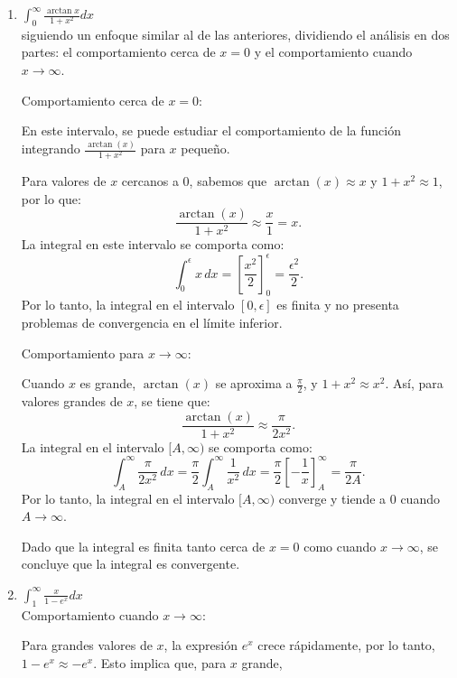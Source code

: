 \documentclass{article}
\begin{document}
\begin{enumerate}
\begin{enumerate}
Comportamiento para \(x\) cerca de \(\pi\):

En el intervalo \((0, \pi)\), cuando \(x\) se aleja de 0 y se acerca a \(\pi\), la función \(\cos(x)\) es finita y no presenta problemas de divergencia. Por lo tanto, no hay problemas en el límite superior de la integral.

La singularidad en \(x = 0\) es suficiente para que la integral diverja. Por lo tanto, la integral es divergente debido al comportamiento de la función cerca de \(x = 0\).     
		\item $ \int_{0}^{\infty} \frac{\arctan x}{1+x^2}dx $
        \[\]
 siguiendo un enfoque similar al de las anteriores, dividiendo el análisis en dos partes: el comportamiento cerca de \(x = 0\) y el comportamiento cuando \(x \to \infty\).

Comportamiento cerca de \(x = 0\):

En este intervalo, se puede estudiar el comportamiento de la función integrando \(\frac{\arctan(x)}{1 + x^2}\) para \(x\) pequeño.

Para valores de \(x\) cercanos a 0, sabemos que \(\arctan(x) \approx x\) y \(1 + x^2 \approx 1\), por lo que:
\[
\frac{\arctan(x)}{1 + x^2} \approx \frac{x}{1} = x.
\]
La integral en este intervalo se comporta como:
\[
\int_0^\epsilon x \, dx = \left[ \frac{x^2}{2} \right]_0^\epsilon = \frac{\epsilon^2}{2}.
\]
Por lo tanto, la integral en el intervalo \([0, \epsilon]\) es finita y no presenta problemas de convergencia en el límite inferior.

Comportamiento para \(x \to \infty\):

Cuando \(x\) es grande, \(\arctan(x)\) se aproxima a \(\frac{\pi}{2}\), y \(1 + x^2 \approx x^2\). Así, para valores grandes de \(x\), se tiene que:
\[
\frac{\arctan(x)}{1 + x^2} \approx \frac{\pi}{2x^2}.
\]
La integral en el intervalo \([A, \infty)\) se comporta como:
\[
\int_A^\infty \frac{\pi}{2x^2} \, dx = \frac{\pi}{2} \int_A^\infty \frac{1}{x^2} \, dx = \frac{\pi}{2} \left[ -\frac{1}{x} \right]_A^\infty = \frac{\pi}{2A}.
\]
Por lo tanto, la integral en el intervalo \([A, \infty)\) converge y tiende a 0 cuando \(A \to \infty\).

Dado que la integral es finita tanto cerca de \(x = 0\) como cuando \(x \to \infty\), se concluye que la integral es convergente.      
		\item $ \int_{1}^{\infty} \frac{x}{1-e^x}dx $
        \[\]
Comportamiento cuando \(x \to \infty\):

Para grandes valores de \(x\), la expresión \(e^x\) crece rápidamente, por lo tanto, \(1 - e^x \approx -e^x\). Esto implica que, para \(x\) grande,


\end{enumerate}
\end{enumerate}
\end{document}

